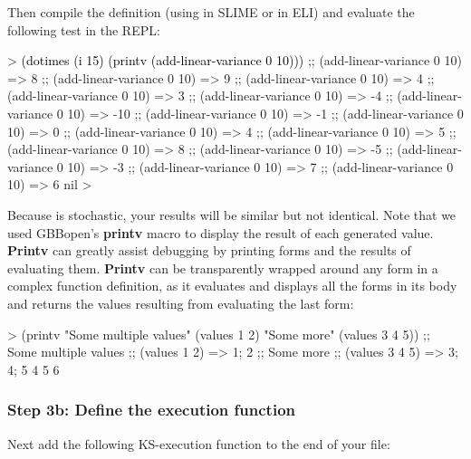 \documentclass[10pt,twoside,english,pdftex]{article}
\begin{document}
Then compile the definition (using  in SLIME or  in ELI) and evaluate the following test in the REPL:

%
\begin{example}\color{darkergray}%
  > \textcolor{black}{(dotimes (i 15) (printv (add-linear-variance 0 10)))}
  ;;  (add-linear-variance 0 10) => 8
  ;;  (add-linear-variance 0 10) => 9
  ;;  (add-linear-variance 0 10) => 4
  ;;  (add-linear-variance 0 10) => 3
  ;;  (add-linear-variance 0 10) => -4
  ;;  (add-linear-variance 0 10) => -10
  ;;  (add-linear-variance 0 10) => -1
  ;;  (add-linear-variance 0 10) => 0
  ;;  (add-linear-variance 0 10) => 4
  ;;  (add-linear-variance 0 10) => 5
  ;;  (add-linear-variance 0 10) => 8
  ;;  (add-linear-variance 0 10) => -5
  ;;  (add-linear-variance 0 10) => -3
  ;;  (add-linear-variance 0 10) => 7
  ;;  (add-linear-variance 0 10) => 6
  nil
  >
\end{example}

Because  is stochastic, your results will be
similar but not identical.  Note that we used GBBopen's \textbf{printv}
macro to display the result of each generated value.  \textbf{Printv} can
greatly assist debugging by printing forms and the results of evaluating
them.  \textbf{Printv} can be transparently wrapped around any form in a
complex function definition, as it evaluates and displays all the forms in
its body and returns the values resulting from evaluating the last form:

\begin{example}\color{darkergray}%
  >  (printv "Some multiple values" (values 1 2) "Some more" (values 3 4 5))
  ;; Some multiple values
  ;;  (values 1 2) => 1; 2
  ;; Some more
  ;;  (values 3 4 5) => 3; 4; 5
  4
  5
  6
\end{example}

\subsubsection*{Step 3b: Define the  execution function}

Next add the following KS-execution function to the end of your
 file:
\end{document}
